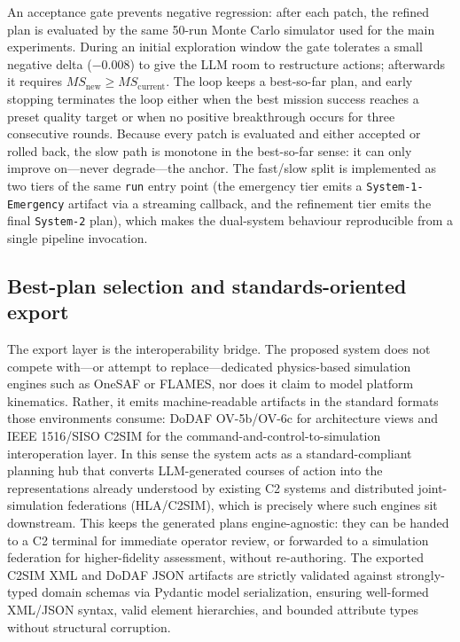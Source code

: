 An acceptance gate prevents negative regression: after each patch, the refined plan is evaluated by the same 50-run Monte Carlo simulator used for the main experiments. During an initial exploration window the gate tolerates a small negative delta ($-0.008$) to give the LLM room to restructure actions; afterwards it requires $MS_{\text{new}} \ge MS_{\text{current}}$. The loop keeps a best-so-far plan, and early stopping terminates the loop either when the best mission success reaches a preset quality target or when no positive breakthrough occurs for three consecutive rounds. Because every patch is evaluated and either accepted or rolled back, the slow path is monotone in the best-so-far sense: it can only improve on---never degrade---the anchor. The fast/slow split is implemented as two tiers of the same \texttt{run} entry point (the emergency tier emits a \texttt{System-1-Emergency} artifact via a streaming callback, and the refinement tier emits the final \texttt{System-2} plan), which makes the dual-system behaviour reproducible from a single pipeline invocation.

\subsection{Best-plan selection and standards-oriented export}

The export layer is the interoperability bridge. The proposed system does not compete with---or attempt to replace---dedicated physics-based simulation engines such as OneSAF or FLAMES, nor does it claim to model platform kinematics. Rather, it emits machine-readable artifacts in the standard formats those environments consume: DoDAF OV-5b/OV-6c for architecture views and IEEE 1516/SISO C2SIM for the command-and-control-to-simulation interoperation layer. In this sense the system acts as a standard-compliant planning hub that converts LLM-generated courses of action into the representations already understood by existing C2 systems and distributed joint-simulation federations (HLA/C2SIM), which is precisely where such engines sit downstream. This keeps the generated plans engine-agnostic: they can be handed to a C2 terminal for immediate operator review, or forwarded to a simulation federation for higher-fidelity assessment, without re-authoring. The exported C2SIM XML and DoDAF JSON artifacts are strictly validated against strongly-typed domain schemas via Pydantic model serialization, ensuring well-formed XML/JSON syntax, valid element hierarchies, and bounded attribute types without structural corruption.

